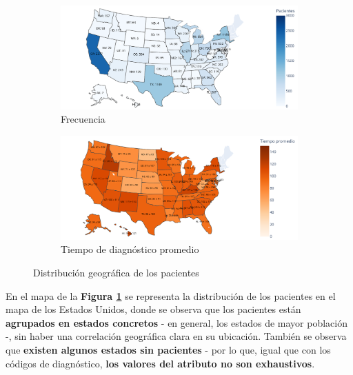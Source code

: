 \begin{figure}[h]
	\begin{center}
		\begin{subfigure}{0.9\linewidth}
			\begin{center}
				\includegraphics[width=\linewidth]{figs/chapter3/categorical/statedist}
				\caption{Frecuencia}\label{fig:ch3statedist}
			\end{center}
		\end{subfigure} 
		\begin{subfigure}{0.9\linewidth}
			\begin{center}
				\includegraphics[width=\linewidth]{figs/chapter3/categorical/statemean}
				\caption{Tiempo de diagnóstico promedio}\label{fig:ch3statemean}
			\end{center}
		\end{subfigure} 
	\end{center}
	\captionsetup{aboveskip=-5pt, belowskip=-15pt, justification=centering}
	\caption{Distribución geográfica de los pacientes}
	\label{fig:ch3state}
\end{figure}

En el mapa de la \textbf{Figura \ref{fig:ch3statedist}} se representa la distribución de los pacientes en el mapa de los Estados Unidos, donde se observa que los pacientes están \textbf{agrupados en estados concretos} - en general, los estados de mayor población -, sin haber una correlación geográfica clara en su ubicación. También se observa que \textbf{existen algunos estados sin pacientes} - por lo que, igual que con los códigos de diagnóstico, \textbf{los valores del atributo no son exhaustivos}.

